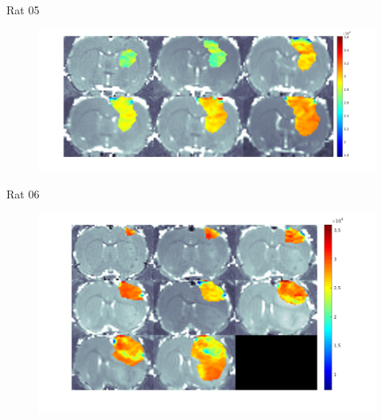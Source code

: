 \documentclass{beamer}
\begin{document}
\begin{frame}{Rat 05}
    \begin{minipage}[t][.7\textheight][t]{\textwidth}
    	\begin{figure}
    	\centering
    	\includegraphics[width=.9\textwidth]{../../mouse-data/Montage05.png}
    	\end{figure}
	\end{minipage}  
\end{frame}

\begin{frame}{Rat 06}
    \begin{minipage}[t][.7\textheight][t]{\textwidth}
    	\begin{figure}
    	\centering
    	\includegraphics[width=.9\textwidth]{../../mouse-data/Montage06.png}
    	\end{figure}
	\end{minipage}  
\end{frame}
\end{document}
